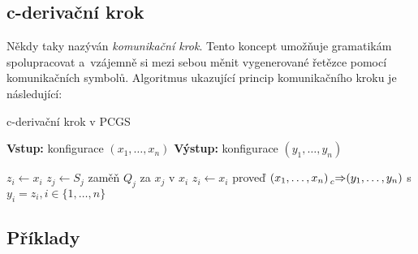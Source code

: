 \subsection*{c-derivační krok}\label{kap_c_der_krok}
Někdy taky nazýván \emph{komunikační krok}. Tento koncept umožňuje gramatikám spolupracovat a~vzájemně si mezi sebou měnit vygenerované řetězce pomocí komunikačních symbolů.
Algoritmus ukazující princip komunikačního kroku je následující:
\begin{algorithm}[h]
\caption{c-derivační krok v PCGS}\label{alg_c_der_krok}
\begin{algorithmic}[1]
    \State \textbf{Vstup:} konfigurace $(x_1, \ldots, x_n)$
    \State \textbf{Výstup:} konfigurace $(y_1, \ldots, y_n)$
    \State 

        \State $z_i \gets x_i$
    \EndFor
                \State $z_j \gets S_j$
                \State zaměň $Q_j$ za $x_j$ v $x_i$
                \State $z_i \gets x_i$ 
            \EndFor
        \EndIf
    \EndFor
    \State proveď $(x_1, \ldots, x_n) \prescript{}{c}{\Rightarrow} (y_1, \ldots, y_n)$ s $y_i = z_i, i \in \{1, \ldots, n\}$ 
\end{algorithmic}
\end{algorithm}


\subsection*{Příklady}\label{PCGS_priklady}

